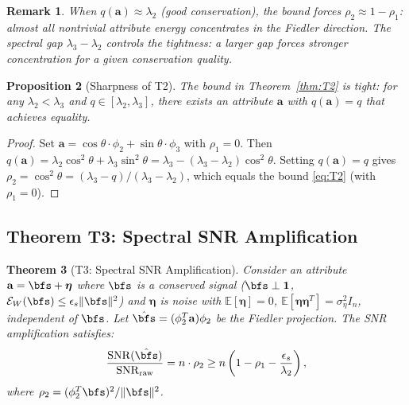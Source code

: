 \documentclass[12pt,letterpaper]{article}
\newtheorem{theorem}{Theorem}[section]
\newtheorem{proposition}[theorem]{Proposition}
\newtheorem{remark}[theorem]{Remark}
\newcommand{\E}{\mathbb{E}}
\newcommand{\One}{\mathbf{1}}
\newcommand{\bfa}{\mathbf{a}}
\newcommand{\cE}{\mathcal{E}}
\begin{document}
\begin{remark}
When $q(\bfa) \approx \lambda_2$ (good conservation), the bound forces $\rho_2 \approx 1 - \rho_1$: almost all nontrivial attribute energy concentrates in the Fiedler direction. The spectral gap $\lambda_3 - \lambda_2$ controls the tightness: a larger gap forces stronger concentration for a given conservation quality.
\end{remark}

\begin{proposition}[Sharpness of T2]
\label{prop:T2-sharp}
The bound in Theorem~\ref{thm:T2} is tight: for any $\lambda_2 < \lambda_3$ and $q \in [\lambda_2, \lambda_3]$, there exists an attribute $\bfa$ with $q(\bfa) = q$ that achieves equality.
\end{proposition}

\begin{proof}
Set $\bfa = \cos\theta \cdot \phi_2 + \sin\theta \cdot \phi_3$ with $\rho_1 = 0$. Then $q(\bfa) = \lambda_2 \cos^2\theta + \lambda_3 \sin^2\theta = \lambda_3 - (\lambda_3 - \lambda_2)\cos^2\theta$. Setting $q(\bfa) = q$ gives $\rho_2 = \cos^2\theta = (\lambda_3 - q)/(\lambda_3 - \lambda_2)$, which equals the bound \eqref{eq:T2} (with $\rho_1 = 0$).
\end{proof}

\subsection{Theorem T3: Spectral SNR Amplification}
\label{sec:T3}

\begin{theorem}[T3: Spectral SNR Amplification]
\label{thm:T3}
Consider an attribute $\bfa = \bfs + \boldsymbol{\eta}$ where $\bfs$ is a conserved signal ($\bfs \perp \One$, $\cE_W(\bfs) \leq \epsilon_s \|\bfs\|^2$) and $\boldsymbol{\eta}$ is noise with $\E[\boldsymbol{\eta}] = 0$, $\E[\boldsymbol{\eta}\boldsymbol{\eta}^T] = \sigma_\eta^2 I_n$, independent of $\bfs$. Let $\hat{\bfs} = (\phi_2^T \bfa)\phi_2$ be the Fiedler projection. The SNR amplification satisfies:
\begin{equation}
\label{eq:T3}
  \frac{\mathrm{SNR}(\hat{\bfs})}{\mathrm{SNR}_{\mathrm{raw}}} = n \cdot \rho_2 \geq n\left(1 - \rho_1 - \frac{\epsilon_s}{\lambda_2}\right),
\end{equation}
where $\rho_2 = (\phi_2^T \bfs)^2/\|\bfs\|^2$.
\end{theorem}
\end{document}
